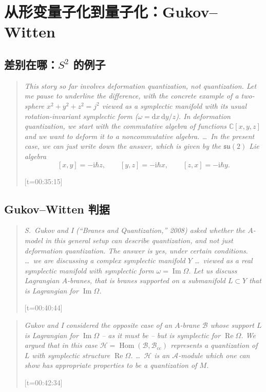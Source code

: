 \documentclass[11pt,a4paper]{ctexart}
\newcommand{\slq}[2]{%
  \begin{quote}\small\itshape #2\par
  \raggedleft\normalfont\footnotesize\textcolor{gray}{[t=#1]}\end{quote}}
\newcommand{\Bcc}{\mathcal{B}_{\mathrm{cc}}}
\newcommand{\Hom}{\operatorname{Hom}}
\begin{document}
\section{从形变量子化到量子化：Gukov–Witten}

\subsection{差别在哪：$S^2$ 的例子}

\slq{00:35:15}{This story so far involves deformation quantization, not quantization. Let me pause to
underline the difference, with the concrete example of a two-sphere $x^2+y^2+z^2=j^2$ viewed as a
symplectic manifold with its usual rotation-invariant symplectic form ($\omega=\mathrm{d}x\,\mathrm{d}y/z$).
In deformation quantization, we start with the commutative algebra of functions $\mathbb{C}[x,y,z]$ and
we want to deform it to a noncommutative algebra. \dots\ In the present case, we can just write down the
answer, which is given by the $\mathfrak{su}(2)$ Lie algebra
\[
[x,y]=-\mathrm{i}\hbar z,\qquad [y,z]=-\mathrm{i}\hbar x,\qquad [z,x]=-\mathrm{i}\hbar y .
\]}


\subsection{Gukov–Witten 判据}

\slq{00:40:44}{S.~Gukov and I (``Branes and Quantization,'' 2008) asked whether the $A$-model in this
general setup can describe quantization, and not just deformation quantization. The answer is yes, under
certain conditions. \dots\ we are discussing a complex symplectic manifold $Y$ \dots\ viewed as a real
symplectic manifold with symplectic form $\omega=\operatorname{Im}\Omega$. Let us discuss Lagrangian
$A$-branes, that is branes supported on a submanifold $L\subset Y$ that is Lagrangian for
$\operatorname{Im}\Omega$.}

\slq{00:42:34}{Gukov and I considered the opposite case of an $A$-brane $\mathcal{B}$ whose support $L$ is
Lagrangian for $\operatorname{Im}\Omega$ -- as it must be -- but is \emph{symplectic} for
$\operatorname{Re}\Omega$. We argued that in this case $\mathcal{H}=\Hom(\mathcal{B},\Bcc)$ represents a
quantization of $L$ with symplectic structure $\operatorname{Re}\Omega$. \dots\ $\mathcal{H}$ is an
$\mathcal{A}$-module which one can show has appropriate properties to be a quantization of $M$.}
\end{document}

